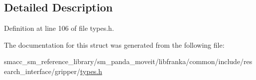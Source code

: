 \subsection{Detailed Description}


Definition at line 106 of file types.\+h.



The documentation for this struct was generated from the following file\+:\begin{DoxyCompactItemize}
\item 
smacc\+\_\+sm\+\_\+reference\+\_\+library/sm\+\_\+panda\+\_\+moveit/libfranka/common/include/research\+\_\+interface/gripper/\hyperlink{types_8h}{types.\+h}\end{DoxyCompactItemize}
